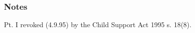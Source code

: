 \documentclass[a4paper]{article}
\newcommand\amendment[1]{\subsubsection*{Notes}{\itshape\frenchspacing\footnotesize #1 \par}}
\begin{document}
%
%
%
%
%
%
%
%


\amendment{

Pt. I revoked (4.9.95) by the Child Support Act 1995 s. 18(8).
}
\end{document}
